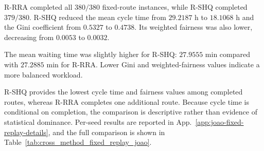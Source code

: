 R-RRA completed all $380/380$ fixed-route instances, while R-SHQ completed
$379/380$. R-SHQ reduced the mean cycle time from $29.2187$ h to $18.1068$ h
and the Gini coefficient from $0.5327$ to $0.4738$. Its weighted fairness was
also lower, decreasing from $0.0053$ to $0.0032$.

The mean waiting time was slightly higher for R-SHQ: $27.9555$ min compared
with $27.2885$ min for R-RRA. Lower Gini and weighted-fairness values indicate
a more balanced workload.

R-SHQ provides the lowest cycle time and fairness values among completed routes, whereas R-RRA completes
one additional route. Because cycle time is conditional on completion, the comparison is descriptive rather than
evidence of statistical dominance. Per-seed results are reported in
App.~\ref{app:joao-fixed-replay-details}, and the full comparison is shown in
Table~\ref{tab:cross_method_fixed_replay_joao}.